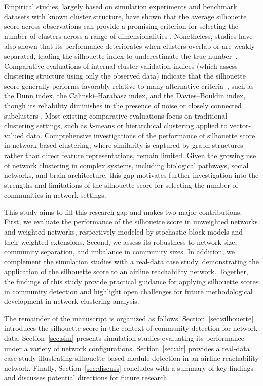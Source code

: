 \documentclass[12pt, titlepage, reqno]{article}
\begin{document}
Empirical studies, largely based on simulation experiments and 
benchmark datasets with known cluster structure, have shown that the 
average silhouette score across observations can provide a promising 
criterion for selecting the number of clusters across a range of 
dimensionalities \citep{starczewski2015performance}.
Nonetheless, studies have also shown that its performance
deteriorates when clusters overlap or are weakly separated,
leading the silhouette index to underestimate the true 
number~\citep{arbelaitz2013extensive}. Comparative evaluations of 
internal cluster validation indices (which assess clustering 
structure using only the observed data) indicate that the silhouette 
score generally performs favorably relative to many alternative 
criteria~\citep{arbelaitz2013extensive}, such as the Dunn index, the 
Calinski--Harabasz index, and the Davies--Bouldin index, though its 
reliability diminishes in the presence of noise or closely
connected subclusters \citep{liu2010understanding}. Most existing 
comparative evaluations focus on traditional clustering settings, 
such as $k$-means or hierarchical clustering applied to vector-valued 
data. Comprehensive investigations of the performance of silhouette 
score in network-based clustering, where similarity is
captured by graph structures rather than direct feature
representations, remain limited. Given the growing use of network 
clustering in complex systems, including biological pathways, social 
networks, and brain architecture, this gap motivates further 
investigation into the strengths and limitations of the silhouette 
score for selecting the number of communities in network settings.


This study aims to fill this research gap and makes two major 
contributions. First, we evaluate the performance of the silhouette 
score in unweighted networks and weighted networks, respectively 
modeled by stochastic block models and their weighted extensions. 
Second, we assess its robustness to network size, community 
separation, and imbalance in community sizes. In addition, we 
complement the simulation studies with a real-data case study, 
demonstrating the application of the silhouette score to an airline 
reachability network. Together, the findings of this study provide 
practical guidance for applying silhouette scores in community 
detection and highlight open challenges for future methodological 
development in network clustering analysis.


The remainder of the manuscript is organized as follows.
Section~\ref{sec:silhouette} introduces the silhouette score in the 
context of community detection for network data.
Section~\ref{sec:sim} presents simulation studies evaluating its 
performance under a variety of network configurations.
Section~\ref{sec:air} provides a real-data case study 
illustrating silhouette-based module detection in an airline 
reachability network. Finally, Section~\ref{sec:discuss} concludes 
with a summary of key findings and discusses potential directions 
for future research.
\end{document}
